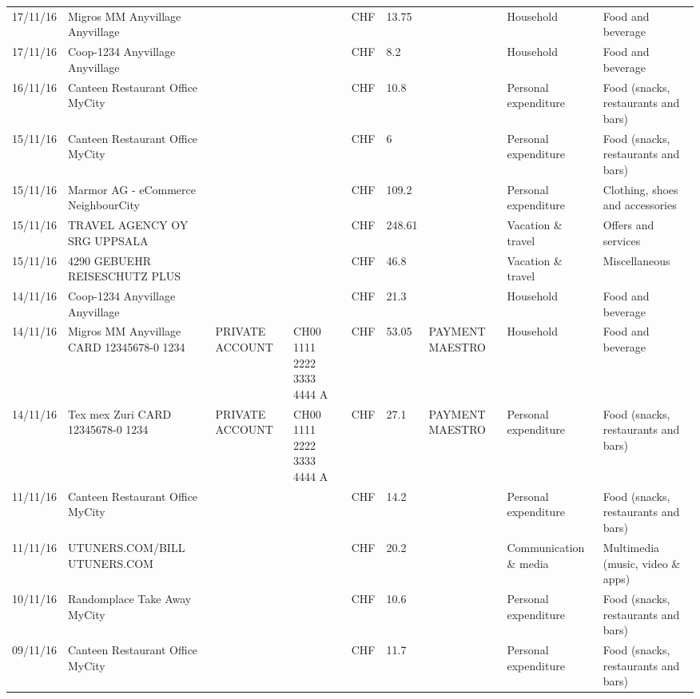 \begin{landscape}
\begin{adjustwidth}{-2cm}{-2cm}
\begin{tiny}
\begin{longtable}{lp{4cm}llllp{3cm}ll}
		17/11/16 & Migros MM Anyvillage    Anyvillage &       &       & CHF   & 13.75 &       & Household & Food and beverage \\
		17/11/16 & Coop-1234 Anyvillage    Anyvillage &       &       & CHF   & 8.2   &       & Household & Food and beverage \\
		16/11/16 & Canteen Restaurant Office      MyCity &       &       & CHF   & 10.8  &       & Personal expenditure & Food (snacks, restaurants and bars) \\
		15/11/16 & Canteen Restaurant Office      MyCity &       &       & CHF   & 6     &       & Personal expenditure & Food (snacks, restaurants and bars) \\
		15/11/16 & Marmor AG - eCommerce     NeighbourCity &       &       & CHF   & 109.2 &       & Personal expenditure & Clothing, shoes and accessories \\
		15/11/16 & TRAVEL AGENCY OY SRG     UPPSALA &       &       & CHF   & 248.61 &       & Vacation \& travel & Offers and services \\
		15/11/16 & 4290 GEBUEHR REISESCHUTZ PLUS &       &       & CHF   & 46.8  &       & Vacation \& travel & Miscellaneous \\
		14/11/16 & Coop-1234 Anyvillage    Anyvillage &       &       & CHF   & 21.3  &       & Household & Food and beverage \\
		14/11/16 & Migros MM Anyvillage CARD 12345678-0 1234 & PRIVATE ACCOUNT & CH00 1111 2222 3333 4444 A & CHF   & 53.05 & PAYMENT MAESTRO & Household & Food and beverage \\
		14/11/16 & Tex mex Zuri CARD 12345678-0 1234 & PRIVATE ACCOUNT & CH00 1111 2222 3333 4444 A & CHF   & 27.1  & PAYMENT MAESTRO & Personal expenditure & Food (snacks, restaurants and bars) \\
		11/11/16 & Canteen Restaurant Office      MyCity &       &       & CHF   & 14.2  &       & Personal expenditure & Food (snacks, restaurants and bars) \\
		11/11/16 & UTUNERS.COM/BILL          UTUNERS.COM &       &       & CHF   & 20.2  &       & Communication \& media & Multimedia (music, video \& apps) \\
		10/11/16 & Randomplace Take Away     MyCity &       &       & CHF   & 10.6  &       & Personal expenditure & Food (snacks, restaurants and bars) \\
		09/11/16 & Canteen Restaurant Office      MyCity &       &       & CHF   & 11.7  &       & Personal expenditure & Food (snacks, restaurants and bars) \\

\end{longtable}
\end{tiny}
\end{adjustwidth}
\end{landscape}
